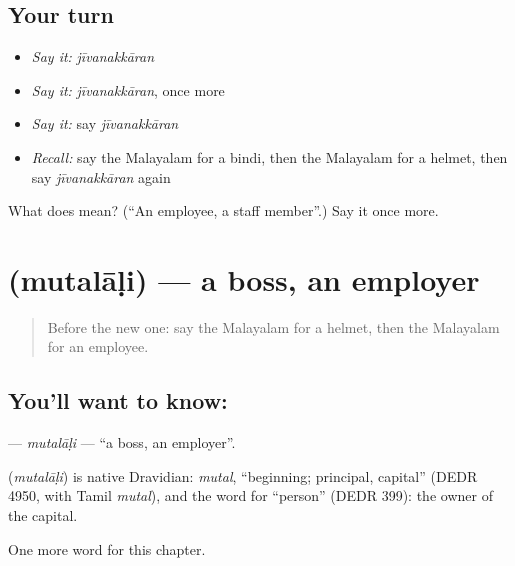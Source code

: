 \subsection*{Your turn}
\begin{itemize}
\raggedright
  \item \emph{Say it:} \emph{jīvanakkāran}
  \item \emph{Say it:} \emph{jīvanakkāran}, once more
  \item \emph{Say it:} say \emph{jīvanakkāran}
  \item \emph{Recall:} say the Malayalam for a bindi, then the Malayalam for a helmet, then say \emph{jīvanakkāran} again
\end{itemize}

\begin{tcolorbox}[breakable,colback=teal!4,colframe=teal!35!black,title={Before you move on}]
What does  mean? (\textquotedblleft{}An employee, a staff member\textquotedblright{}.) Say it once more.
\end{tcolorbox}
\section[\texorpdfstring{\ml{മുതലാളി} (mutalāḷi)}{മുതലാളി (mutalāḷi)}]{ (mutalāḷi) — a boss, an employer}

\label{lesson:ML-C334-mutalali}



\begin{quote}
Before the new one: say the Malayalam for a helmet, then the Malayalam for an employee.
\end{quote}

\subsection*{You'll want to know: }
\textbf{} — \emph{mutalāḷi} — \textquotedblleft{}a boss, an employer\textquotedblright{}.

\begin{cousinweb}
\textbf{} (\emph{mutalāḷi}) is native Dravidian: \emph{mutal}, \textquotedblleft{}beginning; principal, capital\textquotedblright{} (DEDR 4950, with Tamil \emph{mutal}), and the word for \textquotedblleft{}person\textquotedblright{} (DEDR 399): the owner of the capital.
\end{cousinweb}

\begin{grammarlens}[title={What you've built}]
One more word for this chapter.
\end{grammarlens}

